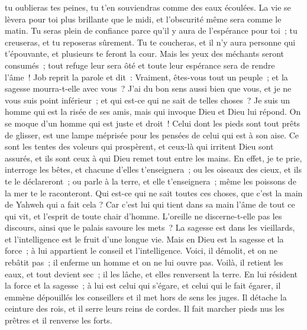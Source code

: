 \begin{multicols}{2}
tu oublieras tes peines, tu t'en souviendras comme des eaux écoulées.
La vie se lèvera pour toi plus brillante que le midi, et l'obscurité même sera comme le matin.
 Tu seras plein de confiance parce qu'il y aura de l'espérance pour toi~; tu creuseras, et tu reposeras sûrement.
Tu te coucheras, et il n'y aura personne qui t'épouvante, et plusieurs te feront la cour. 
Mais les yeux des méchants seront consumés~; tout refuge leur sera ôté et toute leur espérance sera de rendre l'âme~!
\VerseOne{}Job reprit la parole et dit~:
Vraiment, êtes-vous tout un peuple~; et la sagesse mourra-t-elle avec vous~?
J'ai du bon sens aussi bien que vous, et je ne vous suis point inférieur~; et qui est-ce qui ne sait de telles choses~?
Je suis un homme qui est la risée de ses amis, mais qui invoque Dieu et Dieu lui répond. On se moque d'un homme qui est juste et droit~!
 Celui dont les pieds sont tout prêts de glisser, est une lampe méprisée pour les pensées de celui qui est à son aise. 
Ce sont les tentes des voleurs qui prospèrent, et ceux-là qui irritent Dieu sont assurés, et ils sont ceux à qui Dieu remet tout entre les mains.
En effet, je te prie, interroge les bêtes, et chacune d'elles t'enseignera~; ou les oiseaux des cieux, et ils te le déclareront~;
ou parle à la terre, et elle t'enseignera~; même les poissons de la mer te le raconteront. 
Qui est-ce qui ne sait toutes ces choses, que c'est la main de Yahweh qui a fait cela ? 
Car c'est lui qui tient dans sa main l'âme de tout ce qui vit, et l'esprit de toute chair d'homme. 
L'oreille ne discerne-t-elle pas les discours, ainsi que le palais savoure les mets~?
La sagesse est dans les vieillards, et l'intelligence est le fruit d'une longue vie.
Mais en Dieu est la sagesse et la force~; à lui appartient le conseil et l'intelligence.
Voici, il démolit, et on ne rebâtit pas~; il enferme un homme et on ne lui ouvre pas.
Voilà, il retient les eaux, et tout devient sec~; il les lâche, et elles renversent la terre.
En lui résident la force et la sagesse~; à lui est celui qui s'égare, et celui qui le fait égarer,
il emmène dépouillés les conseillers et il met hors de sens les juges.
Il détache la ceinture des rois, et il serre leurs reins de cordes.
Il fait marcher pieds nus les prêtres et il renverse les forts.

\end{multicols}

